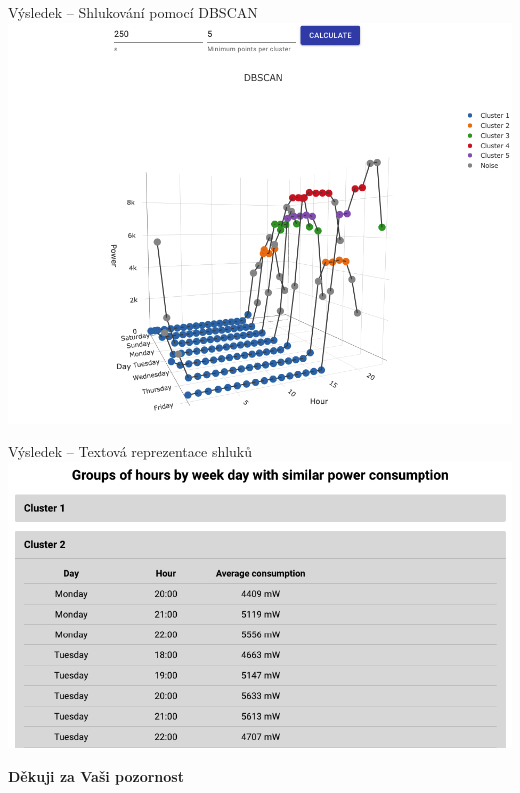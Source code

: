 \documentclass{beamer}
\newcommand\myheading[1]{%
	\par\bigskip
	{\Large\bfseries#1}\par\smallskip}
\begin{document}
\begin{frame}{Výsledek – Shlukování pomocí DBSCAN}
	\centering
	\includegraphics[scale=0.275]{React3}
\end{frame}

\begin{frame}{Výsledek – Textová reprezentace shluků}
	\centering
	\includegraphics[scale=0.275]{React4}
\end{frame}


\begin{frame}
	\centering
	\myheading{Děkuji za Vaši pozornost}
\end{frame}
\end{document}
